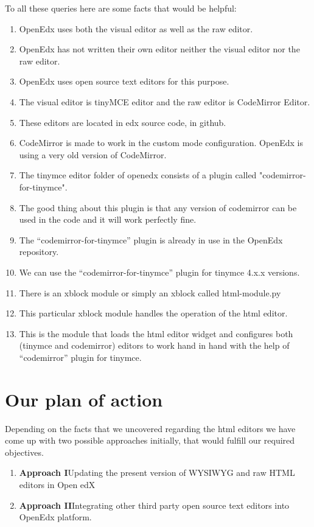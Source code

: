 To all these queries here are some facts that would be helpful:
\begin{enumerate}
\item OpenEdx uses both the visual editor as well as the raw editor.
\item OpenEdx has not written their own editor neither the visual editor nor the raw editor.
\item OpenEdx uses open source text editors for this purpose.
\item The visual editor is tinyMCE editor and the raw editor is CodeMirror Editor.
\item These editors are located in edx source code, in github.
\item CodeMirror is made to work in the custom mode configuration. OpenEdx is using a very old version of CodeMirror.
\item The tinymce editor folder of openedx consists of a plugin called "codemirror-for-tinymce".
\item The good thing about this plugin is that any version of codemirror can be used in the code and it will work perfectly fine.
\item The “codemirror-for-tinymce” plugin is already in use in the OpenEdx repository.
\item We can use the “codemirror-for-tinymce” plugin for tinymce 4.x.x versions.
\item There is an xblock module or simply an xblock called html-module.py
\item This particular xblock module handles the operation of the html editor.
\item This is the module that loads the html editor widget and configures both (tinymce and codemirror) editors to work hand in hand with the help of “codemirror” plugin for tinymce.
\end{enumerate}


\section{Our plan of action}

Depending on the facts that we uncovered regarding the html editors we have come up with
two possible approaches initially, that would fulfill our required objectives.
\begin{enumerate}

\item\textbf{Approach I}\newline Updating the present version of WYSIWYG and raw HTML editors in Open
edX
\item\textbf{Approach II}\newline Integrating other third party open source text editors into OpenEdx platform.
\end{enumerate}

